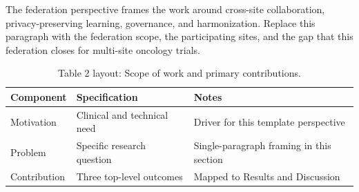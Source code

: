 
The federation perspective frames the work around cross-site collaboration, privacy-preserving learning, governance, and harmonization. Replace this paragraph with the federation scope, the participating sites, and the gap that this federation closes for multi-site oncology trials.

\begin{table}[H]
\caption{Table 2 layout: Scope of work and primary contributions.}
\label{tab:intro_overview}
\centering
\begin{tabular}{>{\raggedright\arraybackslash}p{3.4cm} >{\raggedright\arraybackslash}p{4.6cm} >{\raggedright\arraybackslash}p{5.4cm}}
\toprule
\textbf{Component} & \textbf{Specification} & \textbf{Notes} \\
\midrule
  Motivation & Clinical and technical need & Driver for this template perspective \\
  Problem & Specific research question & Single-paragraph framing in this section \\
  Contribution & Three top-level outcomes & Mapped to Results and Discussion \\
\bottomrule
\end{tabular}
\end{table}
